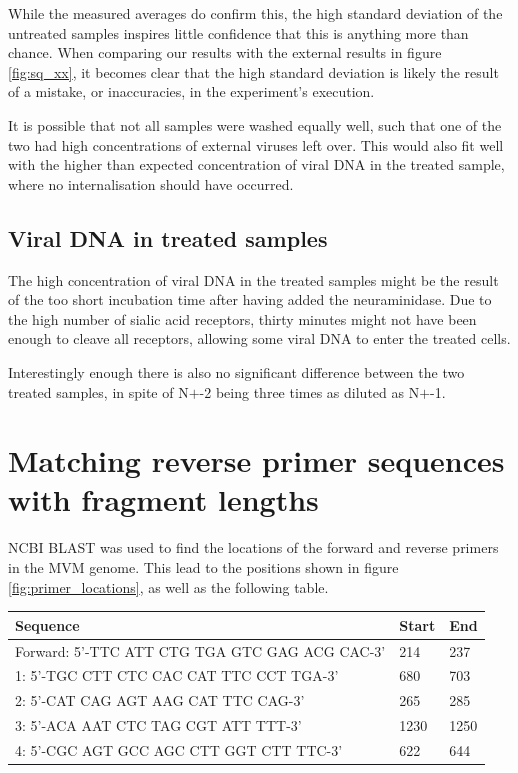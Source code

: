 \documentclass[a4paper,english]{scrreprt}
\begin{document}
While the measured averages do confirm this, the high standard deviation of the
untreated samples inspires little confidence that this is anything more than
chance. When comparing our results with the external results in figure
\ref{fig:sq_xx}, it becomes clear that the high standard deviation is likely
the result of a mistake, or inaccuracies, in the experiment's execution.

It is possible that not all samples were washed equally well, such that one of
the two had high concentrations of external viruses left over. This would also
fit well with the higher than expected concentration of viral DNA in the
treated sample, where no internalisation should have occurred.

\subsection{Viral DNA in treated samples}

The high concentration of viral DNA in the treated samples might be the result
of the too short incubation time after having added the neuraminidase. Due to
the high number of sialic acid receptors, thirty minutes might not have been
enough to cleave all receptors, allowing some viral DNA to enter the treated
cells.

Interestingly enough there is also no significant difference between the two
treated samples, in spite of N$+$-2 being three times as diluted as N$+$-1.

\section{Matching reverse primer sequences with fragment lengths}

NCBI BLAST \cite{website:blast} was used to find the locations of the forward
and reverse primers in the MVM genome. This lead to the positions shown in
figure \ref{fig:primer_locations}, as well as the following table.
\\

\begin{tabu}{lll}
	\toprule
	Sequence & Start & End \\
	\midrule
	Forward: 5’-TTC ATT CTG TGA GTC GAG ACG CAC-3’ & 214 & 237 \\
	1: 5’-TGC CTT CTC CAC CAT TTC CCT TGA-3’ & 680 & 703 \\
	2: 5’-CAT CAG AGT AAG CAT TTC CAG-3’ & 265 & 285 \\
	3: 5’-ACA AAT CTC TAG CGT ATT TTT-3’ & 1230 & 1250 \\
	4: 5’-CGC AGT GCC AGC CTT GGT CTT TTC-3’ & 622 & 644 \\
	\bottomrule
\end{tabu}
\\
\end{document}
